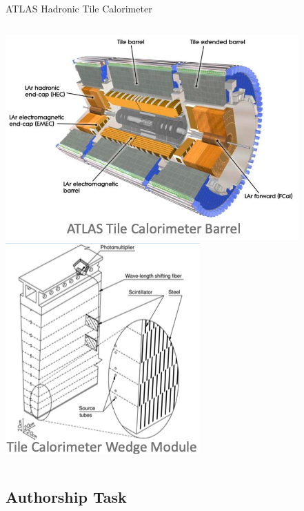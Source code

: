 \documentclass[aspectratio=169,xcolor=table]{beamer}
\begin{document}
\begin{frame}[t]{ATLAS Hadronic Tile Calorimeter}
\begin{columns}
      \centering
        \includegraphics[height=.4\textheight,keepaspectratio=true]{TileCalDiagramATLAS.png}
        \includegraphics[height=.4\textheight,keepaspectratio=true]{TileModuleCrossSection.png}

    \end{columns}
  \end{frame}

  \subsection{Authorship Task}
\end{document}
